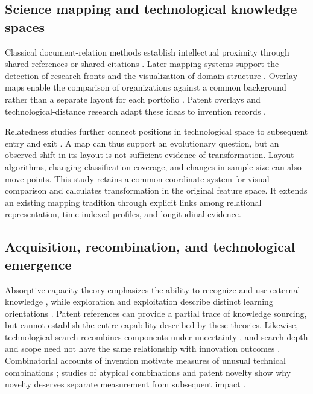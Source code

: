 \subsection{Science mapping and technological knowledge spaces}
Classical document-relation methods establish intellectual proximity through
shared references or shared citations \citep{kessler1963,small1973}. Later mapping
systems support the detection of research fronts and the visualization of domain
structure \citep{borner2003,chen2006,vaneck2010}. Overlay maps enable the comparison
of organizations against a common background rather than a separate layout for
each portfolio \citep{rafols2010}. Patent overlays and technological-distance
research adapt these ideas to invention records
\citep{kay2014,leydesdorff2014,yan2017}.

Relatedness studies further connect positions in technological space to subsequent
entry and exit \citep{kogler2013,rigby2015}. A map can thus support an evolutionary
question, but an observed shift in its layout is not sufficient evidence of
transformation. Layout algorithms, changing classification coverage, and changes
in sample size can also move points. This study retains a common coordinate system
for visual comparison and calculates transformation in the original feature space.
It extends an existing mapping tradition through explicit links among relational
representation, time-indexed profiles, and longitudinal evidence.

\subsection{Acquisition, recombination, and technological emergence}
Absorptive-capacity theory emphasizes the ability to recognize and use external
knowledge \citep{cohen1990}, while exploration and exploitation describe distinct
learning orientations \citep{march1991}. Patent references can provide a partial
trace of knowledge sourcing, but cannot establish the entire capability described
by these theories. Likewise, technological search recombines components under
uncertainty \citep{fleming2001,fleming2004}, and search depth and scope need not
have the same relationship with innovation outcomes \citep{katila2002}.
Combinatorial accounts of invention motivate measures of unusual technical
combinations \citep{youn2015}; studies of atypical combinations and patent novelty
show why novelty deserves separate measurement from subsequent impact
\citep{uzzi2013,verhoeven2016,wang2017}.

